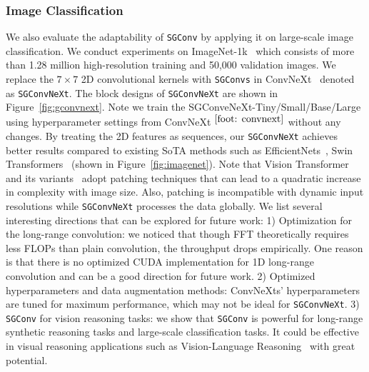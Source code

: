 \subsubsection{Image Classification}\label{sec: imagenet} We also evaluate the adaptability of \texttt{SGConv} by applying it on large-scale image classification. We conduct experiments on ImageNet-1k~\citep{deng2009imagenet} which consists of more than 1.28 million high-resolution training and 50,000 validation images. We replace the $7\times 7$ 2D convolutional kernels with \texttt{SGConvs} in ConvNeXt~\citep{liu2022convnet} denoted as \texttt{SGConvNeXt}. The block designs of \texttt{SGConvNeXt} are shown in Figure~\ref{fig:gconvnext}. Note we train the SGConveNeXt-Tiny/Small/Base/Large using hyperparameter settings from ConvNeXt
    $^{\ref{foot: convnext}}$ without any changes. By treating the 2D features as sequences, our \texttt{SGConvNeXt} achieves better results compared to existing SoTA methods such as EfficientNets~\citep{tan2019efficientnet}, Swin Transformers~\citep{liu2021swin} (shown in Figure~\ref{fig:imagenet}). Note that Vision Transformer~\citep{dosovitskiy2020image} and its variants~\citep{touvron2021training, touvron2021going,yu2022metaformer} adopt patching techniques that can lead to a quadratic increase in complexity with image size. Also, patching is incompatible with dynamic input resolutions while \texttt{SGConvNeXt} processes the data globally. We list several interesting directions that can be explored for future work: 1) Optimization for the long-range convolution: we noticed that though FFT theoretically requires less FLOPs than plain convolution, the throughput drops empirically. One reason is that there is no optimized CUDA implementation for 1D long-range convolution and can be a good direction for future work. 2) Optimized hyperparameters and data augmentation methods: ConvNeXts' hyperparameters are tuned for maximum performance, which may not be ideal for \texttt{SGConvNeXt}. 3) \texttt{SGConv} for vision reasoning tasks: we show that \texttt{SGConv} is powerful for long-range synthetic reasoning tasks and large-scale classification tasks. It could be effective in visual reasoning applications such as Vision-Language Reasoning~\citep{johnson2017clevr,zhu2020vision} with great potential. 

